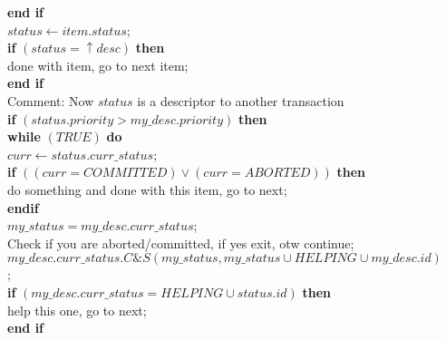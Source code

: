 \documentclass[11pt]{article}
\begin{document}
\begin{figure}[htb]
{{\begin{minipage}[t]{150mm}
\begin{tabbing}
 \>\> {\bf end if} \\

 \>\> $status \gets item.status$; \\

 \>\> {\bf if} $(status = \uparrow desc)$ {\bf then} \\

 \>\>\> done with item, go to next item; \\

 \>\> {\bf end if} \\

 \>\> Comment: Now $status$ is a descriptor to another transaction \\

 \>\> {\bf if} $(status.priority > my\_desc.priority)$ {\bf then} \\

 \>\>\> {\bf while} $(\mathit{TRUE})$ {\bf do} \\

 \>\>\>\> $curr \gets status.curr\_status$; \\

 \>\>\>\> {\bf if} $((curr = \mathit{COMMITTED}) \vee (curr = \mathit{ABORTED}))$ {\bf then} \\

 \>\>\>\>\> do something and done with this item, go to next; \\

 \>\>\>\> {\bf endif} \\

 \>\>\>\> $my\_status = my\_desc.curr\_status$; \\

 \>\>\>\> Check if you are aborted/committed, if yes exit, otw continue; \\

 \>\>\>\> $my\_desc.curr\_status.C\&S(my\_status, my\_status \cup \mathit{HELPING} \cup my\_desc.id)$; \\

 \>\>\>\> {\bf if} $(my\_desc.curr\_status = \mathit{HELPING} \cup status.id)$ {\bf then} \\

 \>\>\>\>\> help this one, go to next; \\

 \>\>\>\> {\bf end if} \\


\end{tabbing}
\end{minipage}}}
\end{figure}
\end{document}
